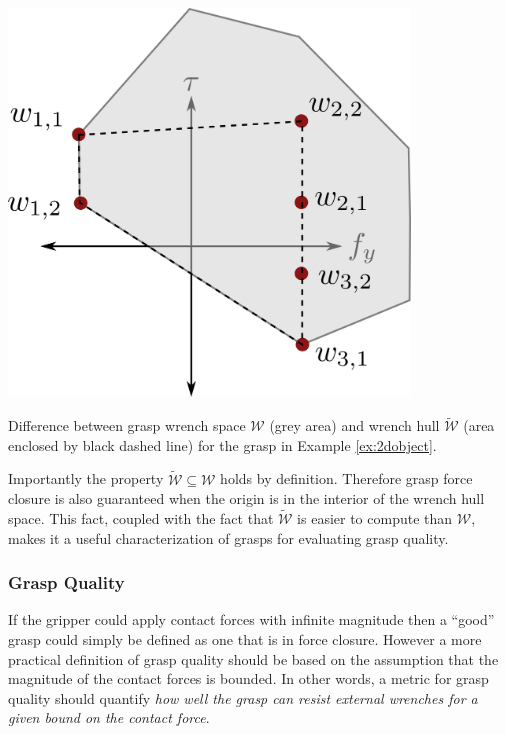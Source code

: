 \begin{marginfigure} 
\begin{center}
\includegraphics[width=0.8\textwidth]{tex/figs/ch26_figs/2Dexample_e.png}
\caption{Difference between grasp wrench space $\mathcal{W}$ (grey area) and wrench hull $\tilde{\mathcal{W}}$ (area enclosed by black dashed line) for the grasp in Example \ref{ex:2dobject}.}
\label{fig:wrenchhull}
\end{center}
\end{marginfigure}

Importantly the property $\tilde{\mathcal{W}} \subseteq \mathcal{W}$ holds by definition. Therefore grasp force closure is also guaranteed when the origin is in the interior of the wrench hull space. This fact, coupled with the fact that $\tilde{\mathcal{W}}$ is easier to compute than $\mathcal{W}$, makes it a useful characterization of grasps for evaluating grasp quality.

\subsubsection{Grasp Quality}
If the gripper could apply contact forces with infinite magnitude then a ``good'' grasp could simply be defined as one that is in force closure. However a more practical definition of grasp quality should be based on the assumption that the magnitude of the contact forces is bounded. In other words, a metric for grasp quality should quantify \textit{how well the grasp can resist external wrenches for a given bound on the contact force}.

